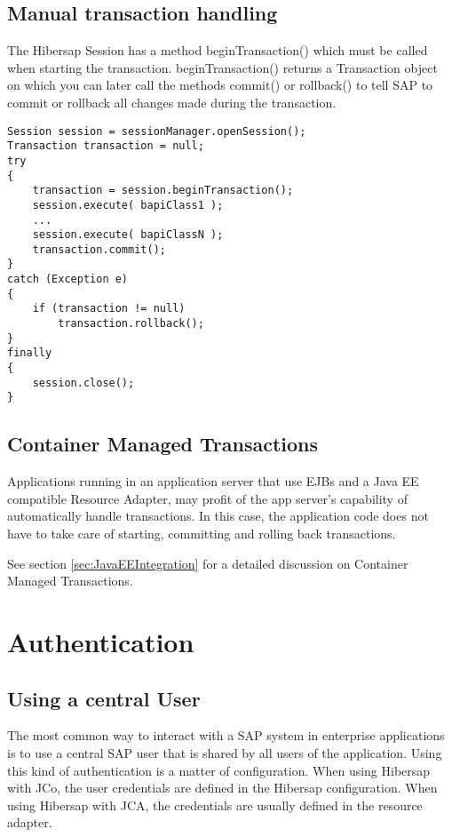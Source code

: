 \subsection{Manual transaction handling}

The Hibersap Session has a method beginTransaction() which must be called when starting the transaction. beginTransaction() returns a Transaction object on which you can later call the methods commit() or rollback() to tell SAP to commit or rollback all changes made during the transaction.

\begin{lstlisting}[caption=Manual transaction handling]
Session session = sessionManager.openSession();
Transaction transaction = null;
try
{
    transaction = session.beginTransaction();
    session.execute( bapiClass1 );
    ...
    session.execute( bapiClassN );
	transaction.commit();
}
catch (Exception e)
{
    if (transaction != null)
        transaction.rollback();
}
finally
{
    session.close();
}
\end{lstlisting}

\subsection{Container Managed Transactions}

Applications running in an application server that use EJBs and a Java EE compatible Resource Adapter, may profit of the
app server's capability of automatically handle transactions. In this case, the application code does not have to
take care of starting, committing and rolling back transactions. 

See section \ref{sec:JavaEEIntegration} for a detailed discussion on Container Managed Transactions.

\section{Authentication}

\subsection{Using a central User}

The most common way to interact with a SAP system in enterprise applications is to use a central SAP user that is shared by all users of the application. Using this kind of authentication is a matter of configuration. When using Hibersap with JCo, the user credentials are defined in the Hibersap configuration. When using Hibersap with JCA, the credentials are usually defined in the resource adapter.

